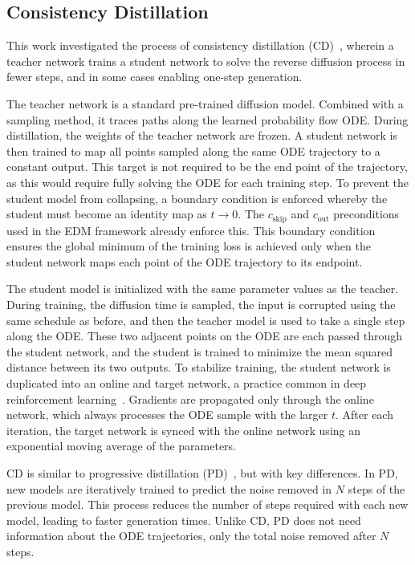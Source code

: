 \subsection{Consistency Distillation}

This work investigated the process of consistency distillation (CD)~\cite{ConsistencyModels}, wherein a teacher network trains a student network to solve the reverse diffusion process in fewer steps, and in some cases enabling one-step generation.

The teacher network is a standard pre-trained diffusion model.
Combined with a sampling method, it traces paths along the learned probability flow ODE.
During distillation, the weights of the teacher network are frozen.
A student network is then trained to map all points sampled along the same ODE trajectory to a constant output.
This target is not required to be the end point of the trajectory, as this would require fully solving the ODE for each training step.
To prevent the student model from collapsing, a boundary condition is enforced whereby the student must become an identity map as $t \rightarrow 0$.
The $c_\text{skip}$ and $c_\text{out}$ preconditions used in the EDM framework already enforce this.
This boundary condition ensures the global minimum of the training loss is achieved only when the student network maps each point of the ODE trajectory to its endpoint.

The student model is initialized with the same parameter values as the teacher.
During training, the diffusion time is sampled, the input is corrupted using the same schedule as before, and then the teacher model is used to take a single step along the ODE.
These two adjacent points on the ODE are each passed through the student network, and the student is trained to minimize the mean squared distance between its two outputs.
To stabilize training, the student network is duplicated into an online and target network, a practice common in deep reinforcement learning~\cite{PlayingAtariDeep, ContinuousControlDeep, ImplicitQuantileNetworks}.
Gradients are propagated only through the online network, which always processes the ODE sample with the larger $t$.
After each iteration, the target network is synced with the online network using an exponential moving average of the parameters.

CD is similar to progressive distillation (PD)~\cite{ProgressiveDistillationFast}, but with key differences.
In PD, new models are iteratively trained to predict the noise removed in $N$ steps of the previous model.
This process reduces the number of steps required with each new model, leading to faster generation times.
Unlike CD, PD does not need information about the ODE trajectories, only the total noise removed after $N$ steps.

